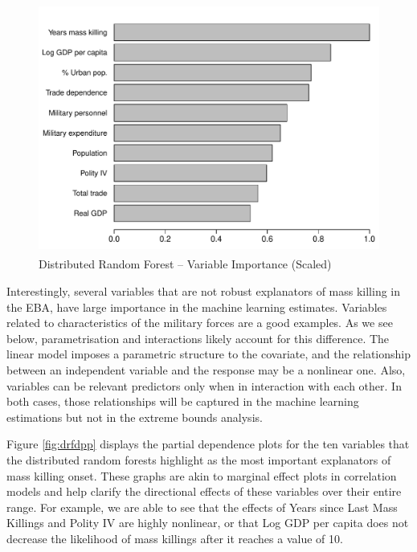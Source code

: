 \documentclass[a4paper,12pt]{article}
\begin{document}
\begin{figure}[ht]
    \centering
    \includegraphics[width=.8\textwidth, height=8.25cm]{images/rf-mk.pdf}
    \caption{Distributed Random Forest -- Variable Importance (Scaled)}
    \label{fig:drfuv}
\end{figure}
	
Interestingly, several variables that are not robust explanators of mass killing in the EBA, have large importance in the machine learning estimates. Variables related to characteristics of the military forces are a good examples. As we see below, parametrisation and interactions likely account for this difference. The linear model imposes a parametric structure to the covariate, and the relationship between an independent variable and the response may be a nonlinear one. Also, variables can be relevant predictors only when in interaction with each other. In both cases, those relationships will be captured in the machine learning estimations but not in the extreme bounds analysis. 


Figure \ref{fig:drfdpp} displays the partial dependence plots for the ten variables that the distributed random forests highlight as the most important explanators of mass killing onset. These graphs are akin to marginal effect plots in correlation models and help clarify the directional effects of these variables over their entire range. For example, we are able to see that the effects of Years since Last Mass Killings and Polity IV are highly nonlinear, or that Log GDP per capita does not decrease the likelihood of mass killings after it reaches a value of 10.
\end{document}
